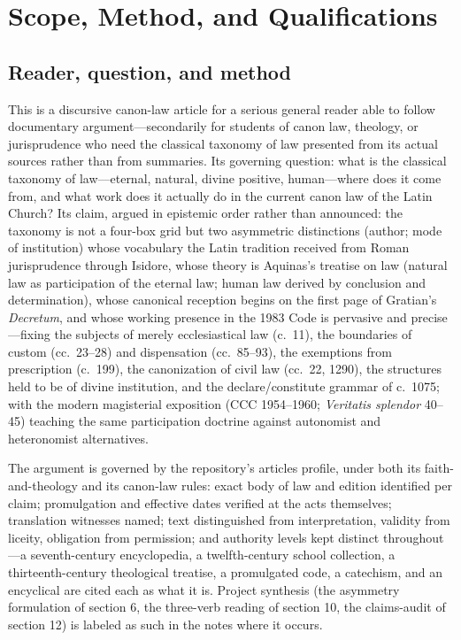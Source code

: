 \section{Scope, Method, and Qualifications}

\subsection{Reader, question, and method}

This is a discursive canon-law article for a serious general reader able to follow documentary argument---secondarily for students of canon law, theology, or jurisprudence who need the classical taxonomy of law presented from its actual sources rather than from summaries. Its governing question: what is the classical taxonomy of law---eternal, natural, divine positive, human---where does it come from, and what work does it actually do in the current canon law of the Latin Church? Its claim, argued in epistemic order rather than announced: the taxonomy is not a four-box grid but two asymmetric distinctions (author; mode of institution) whose vocabulary the Latin tradition received from Roman jurisprudence through Isidore, whose theory is Aquinas's treatise on law (natural law as participation of the eternal law; human law derived by conclusion and determination), whose canonical reception begins on the first page of Gratian's \emph{Decretum}, and whose working presence in the 1983 Code is pervasive and precise---fixing the subjects of merely ecclesiastical law (c.~11), the boundaries of custom (cc.~23--28) and dispensation (cc.~85--93), the exemptions from prescription (c.~199), the canonization of civil law (cc.~22, 1290), the structures held to be of divine institution, and the declare/constitute grammar of c.~1075; with the modern magisterial exposition (CCC 1954--1960; \emph{Veritatis splendor} 40--45) teaching the same participation doctrine against autonomist and heteronomist alternatives.

The argument is governed by the repository's articles profile, under both its faith-and-theology and its canon-law rules: exact body of law and edition identified per claim; promulgation and effective dates verified at the acts themselves; translation witnesses named; text distinguished from interpretation, validity from liceity, obligation from permission; and authority levels kept distinct throughout---a seventh-century encyclopedia, a twelfth-century school collection, a thirteenth-century theological treatise, a promulgated code, a catechism, and an encyclical are cited each as what it is. Project synthesis (the asymmetry formulation of section 6, the three-verb reading of section 10, the claims-audit of section 12) is labeled as such in the notes where it occurs.

